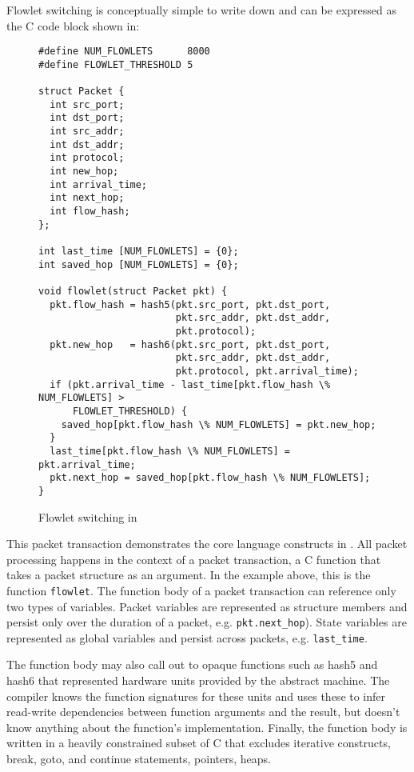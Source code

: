 Flowlet switching is conceptually simple to write down and can be expressed
as the C code block shown in:
\begin{figure}
\begin{small}
\begin{lstlisting}
#define NUM_FLOWLETS      8000
#define FLOWLET_THRESHOLD 5

struct Packet {
  int src_port;
  int dst_port;
  int src_addr;
  int dst_addr;
  int protocol;
  int new_hop;
  int arrival_time;
  int next_hop;
  int flow_hash;
};

int last_time [NUM_FLOWLETS] = {0};
int saved_hop [NUM_FLOWLETS] = {0};

void flowlet(struct Packet pkt) {
  pkt.flow_hash = hash5(pkt.src_port, pkt.dst_port,
                        pkt.src_addr, pkt.dst_addr,
                        pkt.protocol);
  pkt.new_hop   = hash6(pkt.src_port, pkt.dst_port,
                        pkt.src_addr, pkt.dst_addr,
                        pkt.protocol, pkt.arrival_time);
  if (pkt.arrival_time - last_time[pkt.flow_hash \% NUM_FLOWLETS] >
      FLOWLET_THRESHOLD) {
    saved_hop[pkt.flow_hash \% NUM_FLOWLETS] = pkt.new_hop;
  }
  last_time[pkt.flow_hash \% NUM_FLOWLETS] = pkt.arrival_time;
  pkt.next_hop = saved_hop[pkt.flow_hash \% NUM_FLOWLETS];
}
\end{lstlisting}
\end{small}
\label{fig:flowlet}
\caption{Flowlet switching in \pktlanguage}
\end{figure}

This packet transaction demonstrates the core language constructs in
\pktlanguage. All packet processing happens in the context of a packet
transaction, a C function that takes a packet structure as an argument.  In the
example above, this is the function \texttt{flowlet}. The function body of a
packet transaction can reference only two types of variables. Packet variables
are represented as structure members and persist only over the duration of a
packet, e.g. \texttt{pkt.next\_hop}). State variables are represented as global
variables and persist across packets, e.g. \texttt{last\_time}.

The function body may also call out to opaque functions such as hash5 and hash6
that represented hardware units provided by the abstract machine. The compiler
knows the function signatures for these units and uses these to infer
read-write dependencies between function arguments and the result, but doesn't
know anything about the function's implementation. Finally, the function body
is written in a heavily constrained subset of C that excludes iterative
constructs, break, goto, and continue statements, pointers, heaps.

